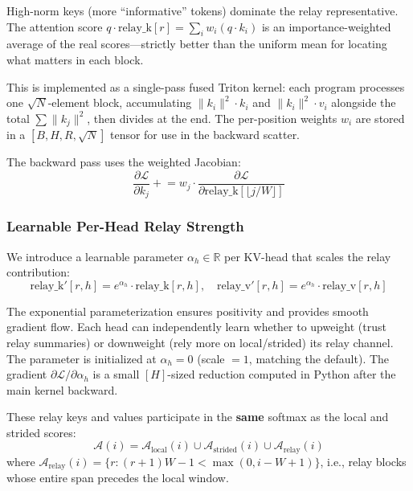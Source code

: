 \documentclass{article}
\begin{document}
    High-norm keys (more ``informative'' tokens) dominate the relay representative. The attention score $q \cdot \text{relay\_k}[r] = \sum_i w_i (q \cdot k_i)$ is an importance-weighted average of the real scores---strictly better than the uniform mean for locating what matters in each block.

    This is implemented as a single-pass fused Triton kernel: each program processes one $\sqrt{N}$-element block, accumulating $\|k_i\|^2 \cdot k_i$ and $\|k_i\|^2 \cdot v_i$ alongside the total $\sum \|k_j\|^2$, then divides at the end. The per-position weights $w_i$ are stored in a $[B, H, R, \sqrt{N}]$ tensor for use in the backward scatter.

    The backward pass uses the weighted Jacobian:
    \begin{equation}
    \frac{\partial \mathcal{L}}{\partial k_j} \mathrel{+}= w_j \cdot \frac{\partial \mathcal{L}}{\partial \text{relay\_k}[\lfloor j/W \rfloor]}
    \end{equation}

    \subsubsection{Learnable Per-Head Relay Strength}

    We introduce a learnable parameter $\alpha_h \in \mathbb{R}$ per KV-head that scales the relay contribution:
    \begin{equation}
    \text{relay\_k}'[r, h] = e^{\alpha_h} \cdot \text{relay\_k}[r, h], \quad \text{relay\_v}'[r, h] = e^{\alpha_h} \cdot \text{relay\_v}[r, h]
    \end{equation}

    The exponential parameterization ensures positivity and provides smooth gradient flow. Each head can independently learn whether to upweight (trust relay summaries) or downweight (rely more on local/strided) its relay channel. The parameter is initialized at $\alpha_h = 0$ (scale $= 1$, matching the default). The gradient $\partial \mathcal{L}/\partial \alpha_h$ is a small $[H]$-sized reduction computed in Python after the main kernel backward.

    These relay keys and values participate in the \textbf{same} softmax as the local and strided scores:
    \begin{equation}
    \mathcal{A}(i) = \mathcal{A}_{\text{local}}(i) \cup \mathcal{A}_{\text{strided}}(i) \cup \mathcal{A}_{\text{relay}}(i)
    \end{equation}
    where $\mathcal{A}_{\text{relay}}(i) = \{r : (r+1)W - 1 < \max(0, i - W + 1)\}$, i.e., relay blocks whose entire span precedes the local window.
\end{document}
